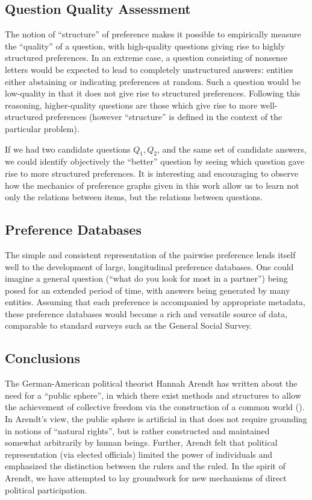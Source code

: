 \subsection{Question Quality Assessment}

The notion of ``structure'' of preference makes it possible to empirically measure the ``quality'' of a question, with high-quality questions giving rise to highly structured preferences.
In an extreme case, a question consisting of nonsense letters would be expected to lead to completely unstructured answers: entities either abstaining or indicating preferences at random.
Such a question would be low-quality in that it does not give rise to structured preferences.
Following this reasoning, higher-quality questions are those which give rise to more well-structured preferences (however ``structure'' is defined in the context of the particular problem).

If we had two candidate questions $Q_1, Q_2$, and the same set of candidate answers, we could identify objectively the ``better'' question by seeing which question gave rise to more structured preferences.
It is interesting and encouraging to observe how the mechanics of preference graphs given in this work allow us to learn not only the relations between items, but the relations between questions.

\subsection{Preference Databases}

The simple and consistent representation of the pairwise preference lends itself well to the development of large, longitudinal preference databases.
One could imagine a general question (``what do you look for most in a partner'') being posed for an extended period of time, with answers being generated by many entities.
Assuming that each preference is accompanied by appropriate metadata, these preference databases would become a rich and versatile source of data, comparable to standard surveys such as the General Social Survey.

\subsection{Conclusions}

The German-American political theorist Hannah Arendt has written about the need for a ``public sphere'', in which there exist methods and structures to allow the achievement of collective freedom via the construction of a common world (\cite{dentreves:2016}).
In Arendt's view, the public sphere is artificial in that does not require grounding in notions of ``natural rights'', but is rather constructed and maintained somewhat arbitrarily by human beings.
Further, Arendt felt that political representation (via elected officials) limited the power of individuals and emphasized the distinction between the rulers and the ruled.
In the spirit of Arendt, we have attempted to lay groundwork for new mechanisms of direct political participation.

